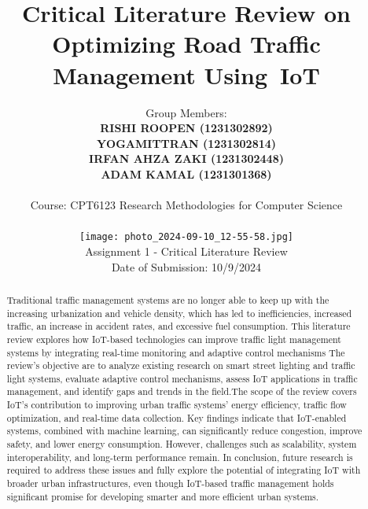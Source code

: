 \documentclass[12pt,a4paper]{article}
\title{Critical Literature Review on Optimizing Road Traffic Management Using IoT}
\author{Group Members: \\
\textbf{RISHI ROOPEN (1231302892)} \\
\textbf{YOGAMITTRAN (1231302814)} \\
\textbf{IRFAN AHZA ZAKI (1231302448)} \\
\textbf{ADAM KAMAL (1231301368)} \\
\\
Course: CPT6123 Research Methodologies for Computer Science \\
\begin{figure}
    \centering
    \texttt{[image: photo\_2024-09-10\_12-55-58.jpg]}
    \caption{Enter Caption}
    \label{fig:enter-label}
\end{figure}
Assignment 1 - Critical Literature Review \\
Date of Submission: 10/9/2024}
\date{}
\begin{document}
\maketitle
\newpage

\begin{abstract}
    \noindent
    Traditional traffic management systems are no longer able to keep up with the increasing urbanization and vehicle density, which has led to inefficiencies, increased traffic, an increase in accident rates, and excessive fuel consumption. This literature review explores how IoT-based technologies can improve traffic light management systems by integrating real-time monitoring and adaptive control mechanisms The review’s objective are to analyze existing research on smart street lighting and traffic light systems, evaluate adaptive control mechanisms, assess IoT applications in traffic management, and identify gaps and trends in the field.The scope of the review covers IoT's contribution to improving urban traffic systems' energy efficiency, traffic flow optimization, and real-time data collection. Key findings indicate that IoT-enabled systems, combined with machine learning, can significantly reduce congestion, improve safety, and lower energy consumption. However, challenges such as scalability, system interoperability, and long-term performance remain. In conclusion, future research is required to address these issues and fully explore the potential of integrating IoT with broader urban infrastructures, even though IoT-based traffic management holds significant promise for developing smarter and more efficient urban systems. 
\end{abstract}
\newpage

\tableofcontents
\newpage

\end{document}
